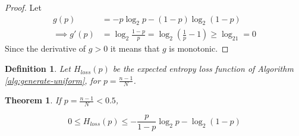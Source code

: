 \documentclass[12pt]{article}
\newtheorem{definition}{Definition}
\newtheorem{theorem}{Theorem}
\begin{document}
\begin{proof}
    Let
    \begin{align}
        g(p) & = -p\log_2 p - (1-p)\log_2(1-p) \\
        \implies g'(p) & = \log_2\frac{1-p}{p} = \log_2(\frac{1}{p}-1) \ge \log_21 = 0 
    \end{align}
Since the derivative of $g>0$ it means that $g$ is monotonic.
\end{proof}

\begin{definition}
    Let $H_{loss}(p)$ be the expected entropy loss function of Algorithm \ref{alg:generate-uniform}, for $p=\frac{n-1}{N}$.
\end{definition}

\begin{theorem}
    \label{thm:loss}
If $p = \frac{n-1}{N} < 0.5$,

\begin{equation}
0 \le H_{loss}(p) \le -\frac{p}{1-p}\log_2p - \log_2(1-p)
\end{equation}

\end{theorem}
\end{document}
